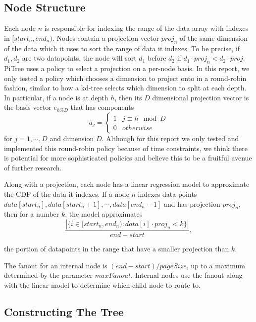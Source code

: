 \documentclass[sigconf,10pt]{acmart}
\begin{document}
\subsection{Node Structure}



Each node $n$ is responsible for indexing the range of the data array with indexes in $[start_n, end_n)$.
Nodes contain a projection vector $proj_n$ of the same dimension of the data
which it uses to sort the range of data it indexes. 
To be precise, if $d_1, d_2$ are two datapoints, the node will 
sort $d_1$ before $d_2$ if $d_1 \cdot proj_n < d_2 \cdot proj$.
PiTree uses a policy to select a projection on a per-node basis. In this report,
we only tested a policy which chooses a dimension to project onto in a round-robin
fashion, similar to how a kd-tree selects which dimension to split at each depth.
In particular, if a node is at depth $h$, then its
$D$ dimensional projection vector is the basis vector $e_{h \% D}$ that has components 
$$a_j = \begin{cases} 
  1 & j \equiv h \mod D \\
  0 & otherwise
\end{cases}
$$
for $j=1, \cdots, D$ and dimension $D$. Although for this report we only 
tested and implemented this round-robin policy because of time constraints,
we think there is potential
for more sophisticated policies and believe this to be a fruitful avenue of further
research.

Along with a projection, each node has a linear regression model 
to approximate the CDF of the data it indexes. If a node $n$ indexes data points
$data[start_n], data[start_n + 1], \cdots, data[end_n - 1]$ and has projection $proj_n$,
then for a number $k$, the
model approximates
\[ 
  \frac{|\{i \in [start_n, end_n) : data[i] \cdot proj_n < k\}|}{end - start},
\]

the portion of datapoints in the range that have a 
smaller projection than $k$.

The fanout for an internal node is $(end - start) / pageSize$, up to a maximum determined
by the parameter $maxFanout$. Internal nodes use the fanout along with the linear model
to determine which child node to route to.

\subsection{Constructing The Tree}
\end{document}
